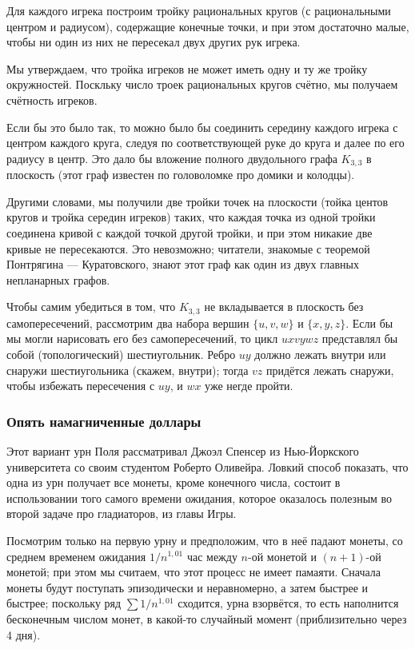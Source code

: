 Для каждого игрека построим тройку рациональных кругов (с рациональными центром и радиусом), содержащие конечные точки, и при этом достаточно малые, чтобы ни один из них не пересекал двух других рук игрека.

Мы утверждаем, что тройка игреков не может иметь одну и ту же тройку окружностей.
Поскльку число троек рациональных кругов счётно, мы получаем счётность игреков. %

Если бы это было так, то можно было бы соединить середину каждого игрека с центром каждого круга, следуя по соответствующей руке до круга и далее по его радиусу в центр.
Это дало бы вложение полного двудольного графа $K_{3,3}$ в плоскость (этот граф известен по головоломке про домики и колодцы).

Другими словами, мы получили две тройки точек на плоскости (тойка центов кругов и тройка середин игреков) таких, что каждая точка из одной тройки соединена кривой с каждой точкой другой тройки, и при этом никакие две кривые не пересекаются.
Это невозможно; читатели, знакомые с теоремой Понтрягина --- Куратовского, знают этот граф как один из двух главных непланарных графов.

Чтобы самим убедиться в том, что $K_{3,3}$ не вкладывается в плоскость без самопересечений, рассмотрим два набора вершин $\{u, v, w\}$ и $\{x, y, z\}$.
Если бы мы могли нарисовать его без самопересечений, то цикл $uxvywz$ представлял бы  собой (топологический) шестиугольник.
Ребро $uy$ должно лежать внутри или снаружи шестиугольника (скажем, внутри);
тогда $vz$ придётся лежать снаружи, чтобы избежать пересечения с $uy$, и $wx$ уже негде пройти.
\heart

\subsubsection*{Опять намагниченные доллары}

Этот вариант урн Поля рассматривал Джоэл Спенсер из Нью-Йоркского университета со своим студентом Роберто Оливейра.
Ловкий способ показать, что одна из урн получает все монеты, кроме конечного числа, состоит в использовании того самого времени ожидания, которое оказалось полезным во второй задаче про гладиаторов, из главы Игры. %

Посмотрим только на первую урну и предположим, что в неё падают монеты, со среднем временем ожидания $1/n^{1{,}01}$ час между $n$-ой монетой и $(n+1)$-ой монетой; при этом мы считаем, что этот процесс не имеет памаяти.
Сначала монеты будут поступать эпизодически и неравномерно, а затем быстрее и быстрее;
поскольку ряд $\sum 1/n^{1{,}01}$ сходится, урна взорвётся, то есть наполнится бесконечным числом монет, в какой-то случайный момент (приблизительно через 4 дня).

